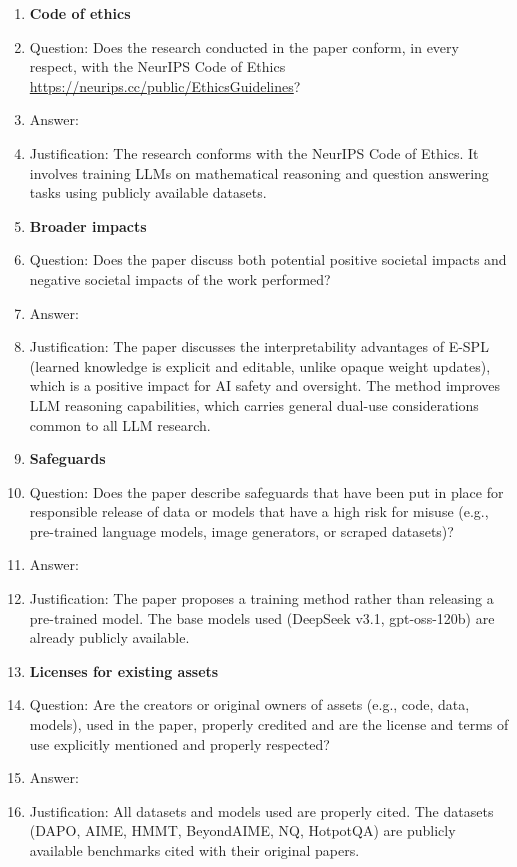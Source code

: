 \begin{enumerate}
\item {\bf Code of ethics}
    \item[] Question: Does the research conducted in the paper conform, in every respect, with the NeurIPS Code of Ethics \url{https://neurips.cc/public/EthicsGuidelines}?
    \item[] Answer: \answerYes{}
    \item[] Justification: The research conforms with the NeurIPS Code of Ethics. It involves training LLMs on mathematical reasoning and question answering tasks using publicly available datasets.

\item {\bf Broader impacts}
    \item[] Question: Does the paper discuss both potential positive societal impacts and negative societal impacts of the work performed?
    \item[] Answer: \answerYes{}
    \item[] Justification: The paper discusses the interpretability advantages of E-SPL (learned knowledge is explicit and editable, unlike opaque weight updates), which is a positive impact for AI safety and oversight. The method improves LLM reasoning capabilities, which carries general dual-use considerations common to all LLM research.

\item {\bf Safeguards}
    \item[] Question: Does the paper describe safeguards that have been put in place for responsible release of data or models that have a high risk for misuse (e.g., pre-trained language models, image generators, or scraped datasets)?
    \item[] Answer: \answerNA{}
    \item[] Justification: The paper proposes a training method rather than releasing a pre-trained model. The base models used (DeepSeek v3.1, gpt-oss-120b) are already publicly available.

\item {\bf Licenses for existing assets}
    \item[] Question: Are the creators or original owners of assets (e.g., code, data, models), used in the paper, properly credited and are the license and terms of use explicitly mentioned and properly respected?
    \item[] Answer: \answerYes{}
    \item[] Justification: All datasets and models used are properly cited. The datasets (DAPO, AIME, HMMT, BeyondAIME, NQ, HotpotQA) are publicly available benchmarks cited with their original papers.


\end{enumerate}
